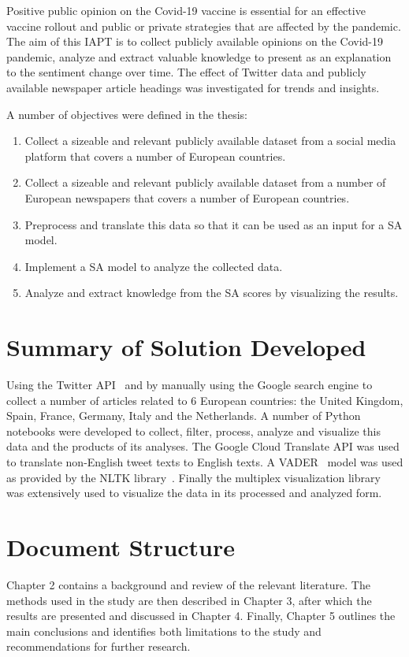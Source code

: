 Positive public opinion on the Covid-19 vaccine is essential for an effective vaccine rollout and public or private strategies that are affected by the pandemic.
The aim of this \ac{IAPT} is to collect publicly available opinions on the Covid-19 pandemic, analyze and extract valuable knowledge to present as an explanation to the sentiment change over time.
The effect of Twitter data and publicly available newspaper article headings was investigated for trends and insights.

\noindent A number of objectives were defined in the thesis:

\begin{enumerate}
  \item Collect a sizeable and relevant publicly available dataset from a social media platform that covers a number of European countries.
  \item Collect a sizeable and relevant publicly available dataset from a number of European newspapers that covers a number of European countries.
  \item Preprocess and translate this data so that it can be used as an input for a \ac{SA} model.
  \item Implement a \ac{SA} model to analyze the collected data.
  \item Analyze and extract knowledge from the \ac{SA} scores by visualizing the results.
\end{enumerate}

\section{Summary of Solution Developed}

Using the Twitter \ac{API}~\citep{roesslein2020tweepy} and by manually using the Google search engine to collect a number of articles related to 6 European countries: the United Kingdom, Spain, France, Germany, Italy and the Netherlands.
A number of Python notebooks were developed to collect, filter, process, analyze and visualize this data and the products of its analyses.
The Google Cloud Translate \ac{API} was used to translate non-English tweet texts to English texts.
A \ac{VADER}~\citep{Hutto_Gilbert_2014} model was used as provided by the \ac{NLTK} library~\citep{bird2009natural}.
Finally the multiplex visualization library~\citep{Mamo2021} was extensively used to visualize the data in its processed and analyzed form.


\section{Document Structure}

Chapter 2 contains a background and review of the relevant literature.
The methods used in the study are then described in Chapter 3, after which the results are presented and discussed in Chapter 4.
Finally, Chapter 5 outlines the main conclusions and identifies both limitations to the study and recommendations for further research.

